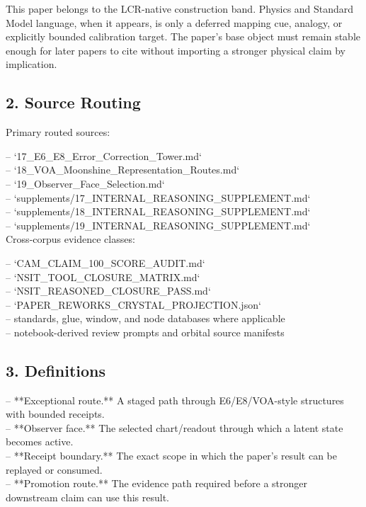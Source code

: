 \documentclass[11pt]{article}
\begin{document}
This paper belongs to the LCR-native construction band. Physics and Standard Model language, when it appears, is only a deferred mapping cue, analogy, or explicitly bounded calibration target. The paper's base object must remain stable enough for later papers to cite without importing a stronger physical claim by implication.

\subsection*{2. Source Routing}

Primary routed sources:

\noindent{}-- `17\_E6\_E8\_Error\_Correction\_Tower.md`\\
\noindent{}-- `18\_VOA\_Moonshine\_Representation\_Routes.md`\\
\noindent{}-- `19\_Observer\_Face\_Selection.md`\\
\noindent{}-- `supplements/17\_INTERNAL\_REASONING\_SUPPLEMENT.md`\\
\noindent{}-- `supplements/18\_INTERNAL\_REASONING\_SUPPLEMENT.md`\\
\noindent{}-- `supplements/19\_INTERNAL\_REASONING\_SUPPLEMENT.md`\\

Cross-corpus evidence classes:

\noindent{}-- `CAM\_CLAIM\_100\_SCORE\_AUDIT.md`\\
\noindent{}-- `NSIT\_TOOL\_CLOSURE\_MATRIX.md`\\
\noindent{}-- `NSIT\_REASONED\_CLOSURE\_PASS.md`\\
\noindent{}-- `PAPER\_REWORKS\_CRYSTAL\_PROJECTION.json`\\
\noindent{}-- standards, glue, window, and node databases where applicable\\
\noindent{}-- notebook-derived review prompts and orbital source manifests\\

\subsection*{3. Definitions}

\noindent{}-- **Exceptional route.** A staged path through E6/E8/VOA-style structures with bounded receipts.\\
\noindent{}-- **Observer face.** The selected chart/readout through which a latent state becomes active.\\
\noindent{}-- **Receipt boundary.** The exact scope in which the paper's result can be replayed or consumed.\\
\noindent{}-- **Promotion route.** The evidence path required before a stronger downstream claim can use this result.\\
\end{document}
